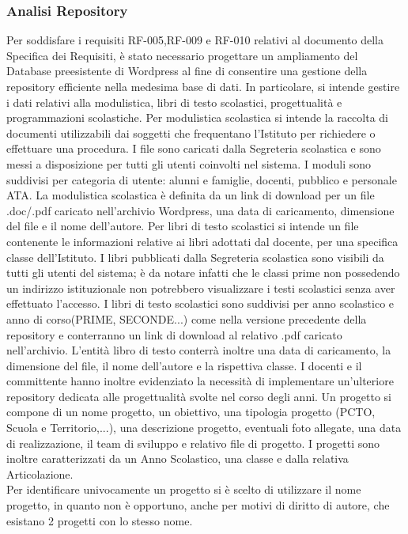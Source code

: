 \documentclass{article}
\begin{document}
	\subsubsection{\textbf{Analisi Repository}}
	Per soddisfare i requisiti RF-005,RF-009 e RF-010 relativi al documento della Specifica dei Requisiti, è stato necessario progettare un ampliamento del Database preesistente di Wordpress al fine di consentire una gestione della repository efficiente nella medesima base di dati.
	In particolare, si intende gestire i dati relativi alla modulistica, libri di testo scolastici, progettualità e programmazioni scolastiche.
	Per modulistica scolastica si intende la raccolta di documenti utilizzabili dai soggetti che frequentano l'Istituto per richiedere o effettuare una procedura. I file sono caricati dalla Segreteria scolastica e sono messi a disposizione per tutti gli utenti coinvolti nel sistema. I moduli sono suddivisi per categoria di utente: alunni e famiglie, docenti, pubblico e personale ATA.
	La modulistica scolastica è definita da un link di download per un file .doc/.pdf caricato nell'archivio Wordpress, una data di caricamento, dimensione del file e il nome dell'autore.
	Per libri di testo scolastici si intende un file contenente le informazioni relative ai libri adottati dal docente, per una specifica classe dell'Istituto. I libri pubblicati dalla Segreteria scolastica sono visibili da tutti gli utenti del sistema; è da notare infatti che le classi prime non possedendo un indirizzo istituzionale non potrebbero visualizzare i testi scolastici senza aver effettuato l'accesso.
	I libri di testo scolastici sono suddivisi per anno scolastico e anno di corso(PRIME, SECONDE...) come nella versione precedente della repository e conterranno un link di download al relativo .pdf caricato nell'archivio. L'entità libro di testo conterrà inoltre una data di caricamento, la dimensione del file, il nome dell'autore e la rispettiva classe.
	I docenti e il committente hanno inoltre evidenziato la necessità di implementare un'ulteriore repository dedicata alle progettualità svolte nel corso degli anni.
	Un progetto si compone di un nome progetto, un obiettivo, una tipologia progetto (PCTO, Scuola e Territorio,...), una descrizione progetto, eventuali foto allegate, una data di realizzazione, il team di sviluppo e relativo file di progetto. I progetti sono inoltre caratterizzati da un Anno Scolastico, una classe e dalla relativa Articolazione.\\ 
	Per identificare univocamente un progetto si è scelto di utilizzare il nome progetto, in quanto non è opportuno, anche per motivi di diritto di autore, che esistano 2 progetti con lo stesso nome.
\end{document}
